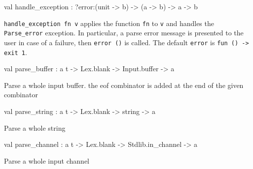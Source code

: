 \documentclass[11pt]{article}
\begin{document}
\label{val:Combinator.handle-underscoreexception}\begin{ocamldoccode}
val handle_exception : ?error:(unit -> {\textquotesingle}b) -> ({\textquotesingle}a -> {\textquotesingle}b) -> {\textquotesingle}a -> {\textquotesingle}b
\end{ocamldoccode}
\begin{ocamldocdescription}
{\tt{handle\_exception fn v}} applies the function {\tt{fn}} to {\tt{v}} and handles
    the {\tt{Parse\_error}} exception. In particular, a parse error message is
    presented to the user in  case  of  a  failure, then {\tt{error ()}}
    is called. The default {\tt{error}} is {\tt{fun () -> exit 1}}.


\end{ocamldocdescription}




\label{val:Combinator.parse-underscorebuffer}\begin{ocamldoccode}
val parse_buffer : {\textquotesingle}a t -> Lex.blank -> Input.buffer -> {\textquotesingle}a
\end{ocamldoccode}
\begin{ocamldocdescription}
Parse a whole input buffer. the eof combinator is added at
    the end of the given combinator


\end{ocamldocdescription}




\label{val:Combinator.parse-underscorestring}\begin{ocamldoccode}
val parse_string : {\textquotesingle}a t -> Lex.blank -> string -> {\textquotesingle}a
\end{ocamldoccode}
\begin{ocamldocdescription}
Parse a whole string


\end{ocamldocdescription}




\label{val:Combinator.parse-underscorechannel}\begin{ocamldoccode}
val parse_channel : {\textquotesingle}a t -> Lex.blank -> Stdlib.in_channel -> {\textquotesingle}a
\end{ocamldoccode}
\begin{ocamldocdescription}
Parse a whole input channel


\end{ocamldocdescription}
\end{document}
